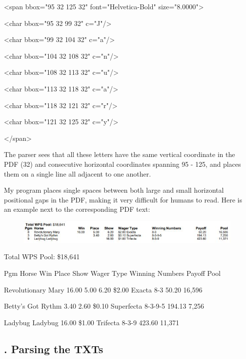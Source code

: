 \documentclass{article}
\begin{document}
\ttfamily
<span bbox="95 32 125 32" font="Helvetica-Bold" size="8.0000">\par
<char bbox="95 32 99 32" c="J"/>\par
<char bbox="99 32 104 32" c="a"/>\par
<char bbox="104 32 108 32" c="n"/>\par
<char bbox="108 32 113 32" c="u"/>\par
<char bbox="113 32 118 32" c="a"/>\par
<char bbox="118 32 121 32" c="r"/>\par
<char bbox="121 32 125 32" c="y"/>\par
</span>
\bigbreak

\rmfamily

\noindent The parser sees that all these letters have the same vertical coordinate in the PDF (32) and consecutive horizontal coordinates spanning 95 - 125, and places them on a single line all adjacent to one another.

My program places single spaces between both large and small horizontal positional gaps in the PDF, making it very difficult for humans to read. Here is an example next to the corresponding PDF text:

\begin{figure}[h]
  \centering
  \includegraphics[width=12cm]{images/betLinesPDF.JPG}
\end{figure}

\ttfamily
\noindent Total WPS Pool: \$18,641\par
\noindent Pgm Horse Win Place Show Wager Type Winning Numbers Payoff Pool\par
{} Revolutionary Mary 16.00 5.00 6.20 \$2.00 Exacta 8-3 50.20 16,596\par
{} Betty's Got Rythm 3.40 2.60 \$0.10 Superfecta 8-3-9-5 194.13 7,256\par
{} Ladybug Ladybug 16.00 \$1.00 Trifecta 8-3-9 423.60 11,371\par
\bigbreak

\rmfamily


\subsection*{. Parsing the TXTs}
\end{document}
